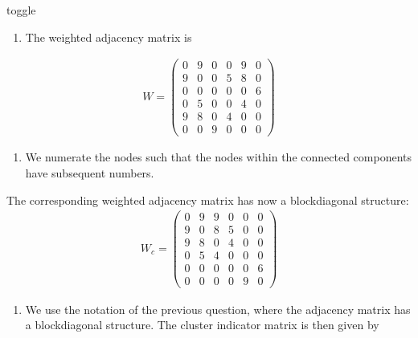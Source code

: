 \documentclass[letterpaper,10pt,english]{jupyterBook}
\begin{document}
\begin{sphinxuseclass}{toggle}\begin{enumerate}
%
\item {} 
\sphinxAtStartPar
The weighted adjacency matrix is

\end{enumerate}
\begin{align*}
W = \begin{pmatrix}
0 & 9 & 0 & 0 & 9 & 0\\
9 & 0 & 0 & 5 & 8 & 0\\
0 & 0 & 0 & 0 & 0 & 6\\
0 & 5 & 0 & 0 & 4 & 0\\
9 & 8 & 0 & 4 & 0 & 0\\
0 & 0 & 9 & 0 & 0 & 0 
\end{pmatrix}
\end{align*}\begin{enumerate}
%
\item {} 
\sphinxAtStartPar
We numerate the nodes such that the nodes within the connected components have subsequent numbers.

\end{enumerate}
\begin{center}\end{center}
\sphinxAtStartPar
The corresponding weighted adjacency matrix has now a block\sphinxhyphen{}diagonal structure:
\begin{align*}
W_c = \begin{pmatrix}
0 & 9 & 9 & 0 & 0 & 0\\
9 & 0 & 8 & 5 & 0 & 0\\
9 & 8 & 0 & 4 & 0 & 0\\
0 & 5 & 4 & 0 & 0 & 0\\
0 & 0 & 0 & 0 & 0 & 6\\
0 & 0 & 0 & 0 & 9 & 0 
\end{pmatrix}
\end{align*}\begin{enumerate}
%
\item {} 
\sphinxAtStartPar
We use the notation of the previous question, where the adjacency matrix has a block\sphinxhyphen{}diagonal structure. The cluster indicator matrix is then given by


\end{enumerate}
\end{sphinxuseclass}
\end{document}
